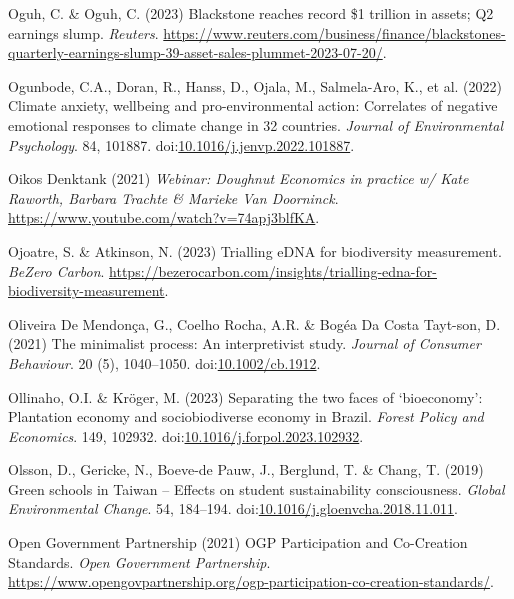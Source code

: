 \documentclass[
  letterpaper,
  DIV=11,
  numbers=noendperiod]{scrartcl}
\newlength{\cslhangindent}
\newenvironment{CSLReferences}[2] %
 {\begin{list}{}{%
  \setlength{\itemindent}{0pt}
  \setlength{\leftmargin}{0pt}
  \setlength{\parsep}{0pt}
  \ifodd #1
   \setlength{\leftmargin}{\cslhangindent}
   \setlength{\itemindent}{-1\cslhangindent}
  \fi
  \setlength{\itemsep}{#2\baselineskip}}}
 {\end{list}}
\begin{document}
\begin{CSLReferences}{0}{1}
Oguh, C. \& Oguh, C. (2023) Blackstone reaches record \$1 trillion in
assets; {Q2} earnings slump. \emph{Reuters}.
\url{https://www.reuters.com/business/finance/blackstones-quarterly-earnings-slump-39-asset-sales-plummet-2023-07-20/}.

Ogunbode, C.A., Doran, R., Hanss, D., Ojala, M., Salmela-Aro, K., et al.
(2022) Climate anxiety, wellbeing and pro-environmental action:
Correlates of negative emotional responses to climate change in 32
countries. \emph{Journal of Environmental Psychology}. 84, 101887.
doi:\href{https://doi.org/10.1016/j.jenvp.2022.101887}{10.1016/j.jenvp.2022.101887}.

Oikos Denktank (2021) \emph{Webinar: {Doughnut Economics} in practice w/
{Kate Raworth}, {Barbara Trachte} \& {Marieke Van Doorninck}}.
\url{https://www.youtube.com/watch?v=74apj3blfKA}.

Ojoatre, S. \& Atkinson, N. (2023) Trialling {eDNA} for biodiversity
measurement. \emph{BeZero Carbon}.
\url{https://bezerocarbon.com/insights/trialling-edna-for-biodiversity-measurement}.

Oliveira De Mendonça, G., Coelho Rocha, A.R. \& Bogéa Da Costa Tayt-son,
D. (2021) The minimalist process: {An} interpretivist study.
\emph{Journal of Consumer Behaviour}. 20 (5), 1040--1050.
doi:\href{https://doi.org/10.1002/cb.1912}{10.1002/cb.1912}.

Ollinaho, O.I. \& Kröger, M. (2023) Separating the two faces of
{`bioeconomy'}: {Plantation} economy and sociobiodiverse economy in
{Brazil}. \emph{Forest Policy and Economics}. 149, 102932.
doi:\href{https://doi.org/10.1016/j.forpol.2023.102932}{10.1016/j.forpol.2023.102932}.

Olsson, D., Gericke, N., Boeve-de Pauw, J., Berglund, T. \& Chang, T.
(2019) Green schools in {Taiwan} -- {Effects} on student sustainability
consciousness. \emph{Global Environmental Change}. 54, 184--194.
doi:\href{https://doi.org/10.1016/j.gloenvcha.2018.11.011}{10.1016/j.gloenvcha.2018.11.011}.

Open Government Partnership (2021) {OGP Participation} and {Co-Creation
Standards}. \emph{Open Government Partnership}.
\url{https://www.opengovpartnership.org/ogp-participation-co-creation-standards/}.


\end{CSLReferences}
\end{document}
